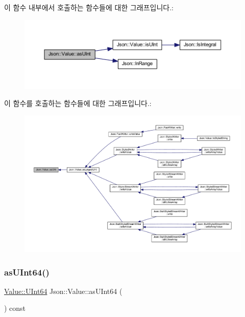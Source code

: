 이 함수 내부에서 호출하는 함수들에 대한 그래프입니다.\+:\nopagebreak
\begin{figure}[H]
\begin{center}
\leavevmode
\includegraphics[width=350pt]{class_json_1_1_value_a74b305583ec3aacf4f9dd06e799dc265_cgraph}
\end{center}
\end{figure}
이 함수를 호출하는 함수들에 대한 그래프입니다.\+:\nopagebreak
\begin{figure}[H]
\begin{center}
\leavevmode
\includegraphics[width=350pt]{class_json_1_1_value_a74b305583ec3aacf4f9dd06e799dc265_icgraph}
\end{center}
\end{figure}
\mbox{\label{class_json_1_1_value_a0e44a5a4cd0c099f9570dfa25813eb60}} 
\subsubsection{\texorpdfstring{as\+U\+Int64()}{asUInt64()}}
{\footnotesize\ttfamily \hyperlink{class_json_1_1_value_a8b62564be8c087c6d18de180ff4e13e3}{Value\+::\+U\+Int64} Json\+::\+Value\+::as\+U\+Int64 (\begin{DoxyParamCaption}{ }\end{DoxyParamCaption}) const}



